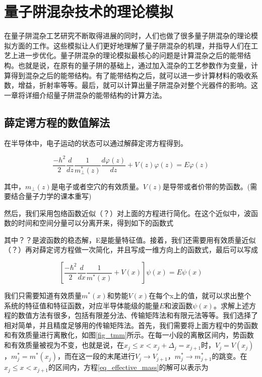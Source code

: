 \documentclass[oneside]{ZJUthesis}
\begin{document}
\chapter{量子阱混杂技术的理论模拟}

在量子阱混杂工艺研究不断取得进展的同时，人们也做了很多量子阱混杂的理论模拟方面的工作。这些模拟让人们更好地理解了量子阱混杂的机理，并指导人们在工艺上进一步优化。量子阱混杂的理论模拟最核心的问题是计算混杂之后的能带结构。也就是说，在原有的量子阱的基础上，通过加入混杂的工艺参数作为变量，计算得到混杂之后的能带结构。有了能带结构之后，就可以进一步计算材料的吸收系数，增益，折射率等等。最后，就可以计算出量子阱混杂对整个光器件的影响。这一章将详细介绍量子阱混杂的能带结构的计算方法。

\section{薛定谔方程的数值解法}

在半导体中，电子运动的状态可以通过解薛定谔方程得到。

\begin{equation}
    \label{schrodinger}
    \frac{-h^2}{2} \frac{d}{dz} \frac{1}{m_\perp^*(z)} \frac{d\varphi(z)}{dz}
    +V(z)\varphi(z)
        = E\varphi(z)
\end{equation}

其中，$m_\perp(z)$是电子或者空穴的有效质量。$V(z)$是导带或者价带的势函数。(需要结合量子力学的课本重写)

然后，我们采用包络函数近似（？）对上面的方程进行简化。在这个近似中，波函数的时间和空间分量可以分离开来，得到如下的函数式

其中？？是波函数的稳态解，E是能量特征值。接着，我们还需要用有效质量近似（？）再对薛定谔方程做一次简化，并且写成一维方向上的函数式，最后可以写成

\begin{equation}
    \label{eq_effective_mass}
    \left[ \frac{-\hbar^2}{2} \frac{d}{dx} \frac{1}{m^*(x)} + V(x) \right] \psi(x) = E \psi(x)
\end{equation}

我们只需要知道有效质量$m^*(x)$和势能$V(x)$在每个x上的值，就可以求出整个系统的特征值和特征函数，对应半导体能级的能量$E$和波函数$\psi(x)$。求解上述方程的数值方法有很多，包括有限差分法、传输矩阵法和有限元法等等。我们选择了相对简单，并且精度足够用的传输矩阵法。首先，我们需要将上面方程中的势函数和有效质量进行离散化，如图\ref{fig_tmm}所示。在每一小段的离散区间内，势函数和有效质量被视为不变，也就是说，在$x_j\le x<x_j+\Delta_j=x_{j+1}$时，$V_j=V(x_j)$，$m^*_j=m^*(x_j)$，而在这一段的末尾进行$V_j\to V_{j+1}$，$m^*_j\to m^*_{j+1}$的跳变。在$x_j\le x<x_{j+1}$的区间内，方程\ref{eq_effective_mass}的解可以表示为
\end{document}
